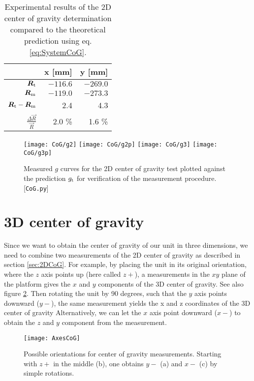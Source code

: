 \documentclass[journal]{IEEEtran}
\begin{document}
\begin{table}
	\centering
	\begin{tabular}{r | r r}
		& x [mm] & y [mm] \\
		\hline
		$\vec{R}_{\textup{t}}$	&	$-116.6$	& $-269.0$ \\
		$\vec{R}_{\textup{m}}$	&	$-119.0$	& $-273.3$ \\
		$\vec{R}_{\textup{t}} - \vec{R}_{\textup{m}}$			&	2.4		& 4.3	\\
		$\frac{\Delta \vec{R}}{\vec{R}}$ &	2.0	\%	& 1.6 \% \\
	\end{tabular}
	\caption{Experimental results of the 2D center of gravity determination compared to the theoretical prediction using eq. \eqref{eq:SystemCoG}.}
	\label{tab:3MassResults}
\end{table}

\begin{figure}
	\centering
	\texttt{[image: CoG/g2]}
	\texttt{[image: CoG/g2p]}
	\texttt{[image: CoG/g3]}
	\texttt{[image: CoG/g3p]}
	\caption{Measured $g$ curves for the 2D center of gravity test plotted against the prediction $g_{\textup{t}}$ for verification of the measurement procedure. [\texttt{CoG.py}]}
	\label{fig:3MassGTest}
\end{figure}

\section{3D center of gravity}

Since we want to obtain the center of gravity of our unit in three dimensions, we need to combine two measurements of the 2D center of gravity as described in section \ref{sec:2DCoG}.
For example, by placing the unit in its original orientation, where the $z$ axis points up (here called $z+$), a measurements in the $xy$ plane of the platform gives the $x$ and $y$ components of the 3D center of gravity. See also figure \ref{fig:AxesCoG}.
Then rotating the unit by 90 degrees, such that the $y$ axis points downward ($y-$), the same measurement yields the x and z coordinates of the 3D center of gravity
Alternatively, we can let the $x$ axis point downward ($x-$) to obtain the $z$ and $y$ component from the measurement.

\begin{figure}
	\centering
	\texttt{[image: AxesCoG]}
	\caption{Possible orientations for center of gravity measurements. Starting with $z+$ in the middle (b), one obtains $y-$ (a) and $x-$ (c) by simple rotations.}
	\label{fig:AxesCoG}
\end{figure}
\end{document}
